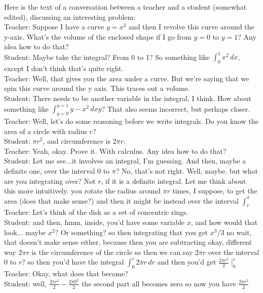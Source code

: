 Here is the text of a conversation between a teacher and a student (somewhat edited), discussing an interesting problem:\\
Teacher: Suppose I have a curve $y = x^2$ and then I revolve this curve around the y-axis. What's the volume of the enclosed shape if I go from $y=0$ to $y=1$? Any idea how to do that?\\
Student: Maybe take the integral? From 0 to 1? So something like $\int^1_0 x^2 \, dx$, except I don't think that's quite right.\\
Teacher: Well, that gives you the area under a curve. But we're saying that we spin this curve around the y axis. This traces out a volume.\\
Student: There needs to be another variable in the integral, I think. How about something like $\int^{y=1}_{y=0} y-x^2 \, dxy$? That also seems incorrect, but perhaps closer.\\
Teacher: Well, let's do some reasoning before we write integrals. Do you know the area of a circle with radius $r$?\\
Student: $\pi r^2$, and circumference is $2\pi r$. \\
Teacher: Yeah, okay. Prove it. With calculus. Any idea how to do that?\\
Student: Let me see...it involves an integral, I'm guessing. And then, maybe a definite one, over the interval $0$ to $\pi$? No, that's not right. Well, maybe. but what are you integrating over? Not $r$, if it is a definite integral. Let me think about this more intuitively.
you rotate the radius around $\pi r$ times, I suppose, to get the area (does that make sense?) and then it might be instead over the interval $\int^{\pi}_r$\\
Teacher: Let's think of the disk as a set of concentric rings.\\
Student: and then, hmm, inside, you'd have some variable $x$, and how would that look...
maybe $x^2$? Or something?
so then integrating that you get $x^3/3$
no wait, that doesn't make sense either, because then you are subtracting
okay, different way
$2\pi r$ is the circumference of the circle
so then we can say $2\pi r$ over the interval $0$ to $r$?
so then you'd have the integral $\int^r_0 2\pi r \, dr$
and then you'd get $\frac{2\pi r^2}{2}\mid^r_0$\\
Teacher: Okay, what does that become?\\
Student: well, $\frac{2\pi r^2}{2}-\frac{2\pi 0^2}{2}$
the second part all becomes zero
so now you have $\frac{2\pi r^2}{2}$
